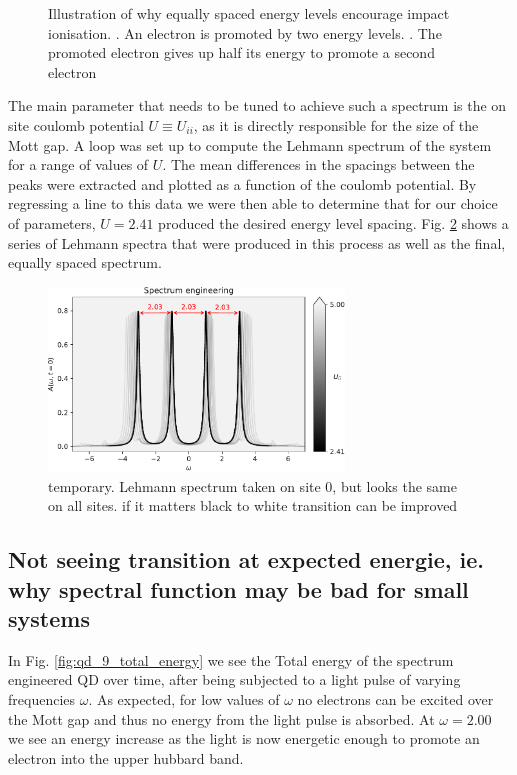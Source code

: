 \begin{figure}[!hbt]
    \captionsetup{singlelinecheck=off}
    \caption{Illustration of why equally spaced energy levels encourage impact ionisation.
    . An electron is promoted by two energy levels. 
    . The promoted electron gives up half its energy to promote a second electron}
    \label{fig:qd_spectrum_delta}
\end{figure}

The main parameter that needs to be tuned to achieve such a spectrum is the on site coulomb potential $U \equiv U_{ii}$, as it is directly responsible for the size of the Mott gap. A loop was set up to compute the Lehmann spectrum of the system for a range of values of $U$. The mean differences in the spacings between the peaks were extracted and plotted as a function of the coulomb potential. By regressing a line to this data we were then able to determine that for our choice of parameters, $U = 2.41$ produced the desired energy level spacing. Fig. \ref{fig:spectrum_engineering} shows a series of Lehmann spectra that were produced in this process as well as the final, equally spaced spectrum.


\begin{figure}[!hbt]
    \centering
    \includegraphics[width=0.7\textwidth]{graph/spectrum_engineering.pdf}
    \caption{temporary. Lehmann spectrum taken on site 0, but looks the same on all sites. if it matters black to white transition can be improved}
    \label{fig:spectrum_engineering}
\end{figure}

\subsection{Not seeing transition at expected energie, ie. why spectral function may be bad for small systems}
In Fig. \ref{fig:qd_9_total_energy} we see the Total energy of the spectrum engineered QD over time, after being subjected to a light pulse of varying frequencies $\omega$. As expected, for low values of $\omega$ no electrons can be excited over the Mott gap and thus no energy from the light pulse is absorbed. At $\omega = 2.00$ we see an energy increase as the light is now energetic enough to promote an electron into the upper hubbard band.

